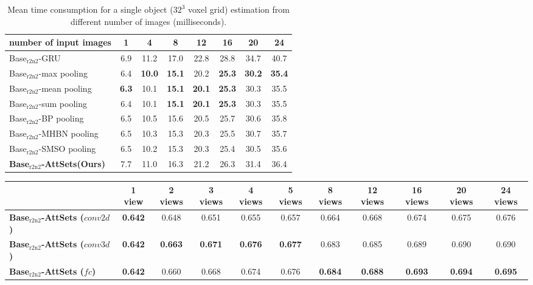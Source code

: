 \documentclass[twocolumn]{svjour3}    \pdfoutput=1
\newcommand{\nickname}{AttSets}
\begin{document}
\begin{table}[t]
\caption{Mean time consumption for a single object ($32^3$ voxel grid) estimation from different number of images (milliseconds).}
\centering
\label{tab:time_con}
\tabcolsep=0.02cm
\begin{tabular}{ l|ccccccc}
\hline
number of input images&1 &4 &8 &12 &16 &20 &24  \\
\hline
Base$_{\textrm{r2n2}}$-GRU &6.9&11.2&17.0&22.8&28.8&34.7&40.7\\
Base$_{\textrm{r2n2}}$-max pooling &6.4&\textbf{10.0}&\textbf{15.1}&20.2&\textbf{25.3}&\textbf{30.2}&\textbf{35.4}\\
Base$_{\textrm{r2n2}}$-mean pooling &\textbf{6.3}&10.1&\textbf{15.1}&\textbf{20.1}&\textbf{25.3}&30.3&35.5 \\
Base$_{\textrm{r2n2}}$-sum pooling &6.4&10.1&\textbf{15.1}&\textbf{20.1}&\textbf{25.3}&30.3&35.5 \\
Base$_{\textrm{r2n2}}$-BP pooling &6.5 &10.5 & 15.6 & 20.5&25.7& 30.6&35.8 \\
Base$_{\textrm{r2n2}}$-MHBN pooling &6.5 &10.3 & 15.3 & 20.3&25.5& 30.7&35.7 \\
Base$_{\textrm{r2n2}}$-SMSO pooling &6.5 &10.2 & 15.3 & 20.3&25.4&30.5&35.6 \\
\textbf{Base$_{\textrm{r2n2}}$-\nickname{}(Ours)} &7.7&11.0&16.3&21.2&26.3&31.4&36.4\\
\hline
\end{tabular}
\vspace{-0.2cm}
\end{table}

\begin{table*}[t]
\caption{ \small{Mean IoU of \nickname{} variants on all 13 categories in ShapeNet$_{\textrm{r2n2}}$ testing split.}}
\centering
\label{tab:iou_variants}
\tabcolsep=0.112cm
\begin{tabular}{ l|cccccccccc}
\hline
&1 view&2 views&3 views& 4 views&5 views&8 views&12 views&16 views&20 views&24 views \\
\hline
\textbf{Base$_{\textrm{r2n2}}$-\nickname{} ($conv2d$)}&\textbf{0.642}&0.648&0.651&0.655&0.657&0.664&0.668&0.674&0.675&0.676\\
\textbf{Base$_{\textrm{r2n2}}$-\nickname{} ($conv3d$)}&\textbf{0.642}&\textbf{0.663}&\textbf{0.671}&\textbf{0.676}&\textbf{0.677}&0.683&0.685&0.689&0.690&0.690 \\
\textbf{Base$_{\textrm{r2n2}}$-\nickname{} ($fc$)} &\textbf{0.642}&0.660&0.668&0.674&0.676&\textbf{0.684}
&\textbf{0.688}&\textbf{0.693}&\textbf{0.694}&\textbf{0.695} \\
\hline
\end{tabular}
\vspace{-0.1cm}
\end{table*}
\end{document}
